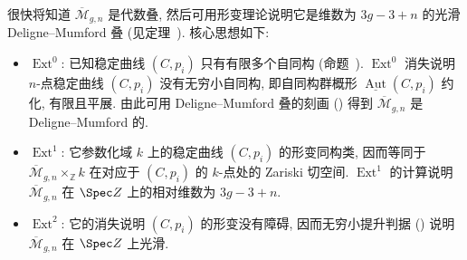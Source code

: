 \begin{remark}[形变理论的推论]\label{src:6.3.31}
很快将知道 $\overline{\mathcal M}_{g,\allowbreak n}$ 是代数叠, 然后可用形变理论说明它是维数为 $3g-3+n$ 的光滑 Deligne--Mumford 叠 (见定理~). 核心思想如下:
\begin{itemize}
\item $\operatorname{Ext}^0$: 已知稳定曲线 $(C,\allowbreak p_i)$ 只有有限多个自同构 (命题~). $\operatorname{Ext}^0$ 消失说明 $n$-点稳定曲线 $(C,\allowbreak p_i)$ 没有无穷小自同构, 即自同构群概形 $\underline{\operatorname{Aut}}(C,\allowbreak p_i)$ 约化, 有限且平展. 由此可用 Deligne--Mumford 叠的刻画 () 得到 $\overline{\mathcal M}_{g,\allowbreak n}$ 是 Deligne--Mumford 的.
\item $\operatorname{Ext}^1$: 它参数化域 $k$ 上的稳定曲线 $(C,\allowbreak p_i)$ 的形变同构类, 因而等同于 $\overline{\mathcal M}_{g,\allowbreak n}\times_{\mathbb Z}k$ 在对应于 $(C,\allowbreak p_i)$ 的 $k$-点处的 Zariski 切空间. $\operatorname{Ext}^1$ 的计算说明 $\overline{\mathcal M}_{g,\allowbreak n}$ 在 $\Spec\mathbb Z$ 上的相对维数为 $3g-3+n$.
\item $\operatorname{Ext}^2$: 它的消失说明 $(C,\allowbreak p_i)$ 的形变没有障碍, 因而无穷小提升判据 () 说明 $\overline{\mathcal M}_{g,\allowbreak n}$ 在 $\Spec\mathbb Z$ 上光滑.
\end{itemize}
\end{remark}

